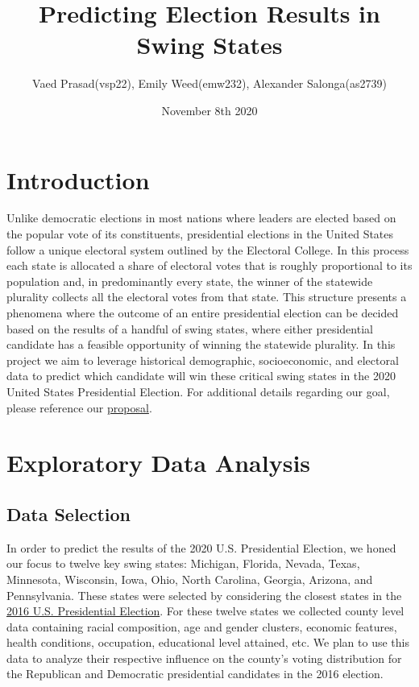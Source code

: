 \documentclass[letterpaper, twocolumn]{article}
\title{Predicting Election Results in Swing States}
\author{Vaed Prasad(vsp22), Emily Weed(emw232), Alexander Salonga(as2739)}
\date{November 8th 2020}
\begin{document}
\maketitle


\section{Introduction}

Unlike democratic elections in most nations where leaders are elected based on the popular vote of its constituents, presidential elections in the United States follow a unique electoral system outlined by the Electoral College. In this process each state is allocated a share of electoral votes that is roughly proportional to its population and, in predominantly every state, the winner of the statewide plurality collects all the electoral votes from that state. This structure presents a phenomena where the outcome of an entire presidential election can be decided based on the results of a handful of swing states, where either presidential candidate has a feasible opportunity of winning the statewide plurality. In this project we aim to leverage historical demographic, socioeconomic, and electoral data to predict which candidate will win these critical swing states in the 2020 United States Presidential Election. For additional details regarding our goal, please reference our \href{https://github.com/salongaale/ORIE-4741-Project/blob/main/project_proposal.md}{proposal}.%
\section{Exploratory Data Analysis}
\subsection{Data Selection}

In order to predict the results of the 2020 U.S. Presidential Election, we honed our focus to twelve key swing states: Michigan, Florida, Nevada, Texas, Minnesota, Wisconsin, Iowa, Ohio, North Carolina, Georgia, Arizona, and Pennsylvania. These states were selected by considering the closest states in the \href{https://www.nytimes.com/elections/2016/results/president}{2016 U.S. Presidential Election}. For these twelve states we collected county level data containing racial composition, age and gender clusters, economic features, health conditions, occupation, educational level attained, etc. We plan to use this data to analyze their respective influence on the county’s voting distribution for the Republican and Democratic presidential candidates in the 2016 election.
\end{document}
